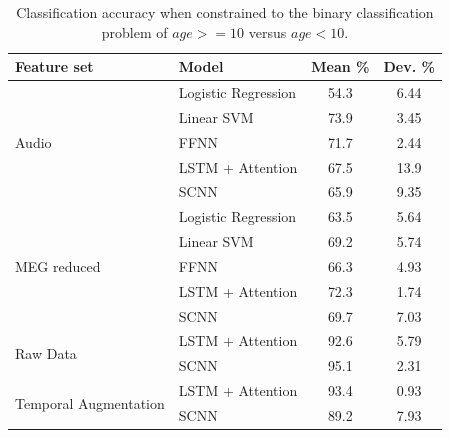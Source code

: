 \documentclass[utf8]{frontiersSCNS} %
\begin{document}
\begin{table}[htp]
  \caption{Classification accuracy when constrained to the binary classification problem of $age >= 10$ versus $age < 10$.}
  \centering
  \begin{tabular}{l l | c | c}
    \toprule
    \textbf{Feature set} & \textbf{Model} & \textbf{Mean \%} & \textbf{Dev. \%} \\
    \toprule
    \multirow{5}{*}{Audio}
                         & Logistic Regression    & 54.3 & 6.44  \\
                         & Linear SVM             & 73.9 & 3.45  \\
                         & FFNN                   & 71.7 & 2.44  \\
                         & LSTM + Attention       & 67.5 & 13.9  \\
                         & SCNN                   & 65.9 & 9.35  \\
    \midrule
    \multirow{5}{*}{MEG reduced}
                         & Logistic Regression    & 63.5 & 5.64  \\
                         & Linear SVM             & 69.2 & 5.74  \\
                         & FFNN                   & 66.3 & 4.93  \\
                         & LSTM + Attention       & 72.3 & 1.74  \\
                         & SCNN                   & 69.7 & 7.03  \\
    
    \midrule
    \multirow{2}{*}{Raw Data}
                         & LSTM + Attention    & 92.6 & 5.79  \\ 
                         & SCNN                & 95.1 & 2.31  \\
    \midrule
    \multirow{2}{*}{Temporal Augmentation}
                         & LSTM + Attention    & 93.4 & 0.93  \\ 
                         & SCNN                & 89.2 & 7.93  \\
    
    \bottomrule
  \end{tabular}
  \label{tab:binary_results}
\end{table}
\end{document}

